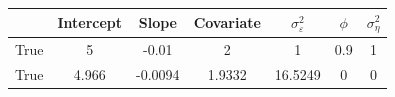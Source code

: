 \begin{tabular}{lcccccc}
\toprule
& Intercept & Slope & Covariate & $\sigma_\varepsilon^2$ & $\phi$ & $\sigma_\eta^2$ \\
\midrule
True & 5 & -0.01 & 2 & 1 & 0.9 & 1 \\
\midrule
True & 4.966 & -0.0094 & 1.9332 & 16.5249 & 0 & 0 \\
\bottomrule
\end{tabular}
